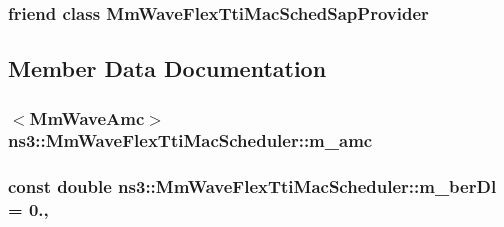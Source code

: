 \subsubsection[{\texorpdfstring{Mm\+Wave\+Flex\+Tti\+Mac\+Sched\+Sap\+Provider}{MmWaveFlexTtiMacSchedSapProvider}}]{\setlength{\rightskip}{0pt plus 5cm}friend class {\bf Mm\+Wave\+Flex\+Tti\+Mac\+Sched\+Sap\+Provider}\hspace{0.3cm}{\ttfamily [friend]}}\hypertarget{classns3_1_1MmWaveFlexTtiMacScheduler_a659e913fedbe23f1d3bb4e642212ea32}{}\label{classns3_1_1MmWaveFlexTtiMacScheduler_a659e913fedbe23f1d3bb4e642212ea32}


\subsection{Member Data Documentation}
\subsubsection[{\texorpdfstring{m\+\_\+amc}{m_amc}}]{$<${\bf Mm\+Wave\+Amc}$>$ ns3\+::\+Mm\+Wave\+Flex\+Tti\+Mac\+Scheduler\+::m\+\_\+amc\hspace{0.3cm}{\ttfamily [private]}}\hypertarget{classns3_1_1MmWaveFlexTtiMacScheduler_a80d0b9fd279dd5c33c52cf0833d264da}{}\label{classns3_1_1MmWaveFlexTtiMacScheduler_a80d0b9fd279dd5c33c52cf0833d264da}
\subsubsection[{\texorpdfstring{m\+\_\+ber\+Dl}{m_berDl}}]{\setlength{\rightskip}{0pt plus 5cm}const double ns3\+::\+Mm\+Wave\+Flex\+Tti\+Mac\+Scheduler\+::m\+\_\+ber\+Dl = 0.\hspace{0.3cm}{\ttfamily [static]}, {\ttfamily [private]}}\hypertarget{classns3_1_1MmWaveFlexTtiMacScheduler_ab18aea68e8746a7584be41c0cc66218c}{}\label{classns3_1_1MmWaveFlexTtiMacScheduler_ab18aea68e8746a7584be41c0cc66218c}
